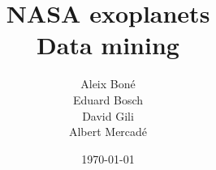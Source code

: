 



\renewcommand\tabularxcolumn[1]{m{#1}}

\usepackage[flushleft]{threeparttable} %
\usepackage[flushleft]{threeparttablex} %

\def\UrlBreaks{\do\/\do-}

\title{NASA exoplanets\\ \Large \normalfont Data mining}
\author{
Aleix Boné \\
Eduard Bosch \\
David Gili \\
Albert Mercadé
}
\date{\today}




    



    \tableofcontents \pagebreak

    \listoffigures \pagebreak
    \listoftables \clearpage



